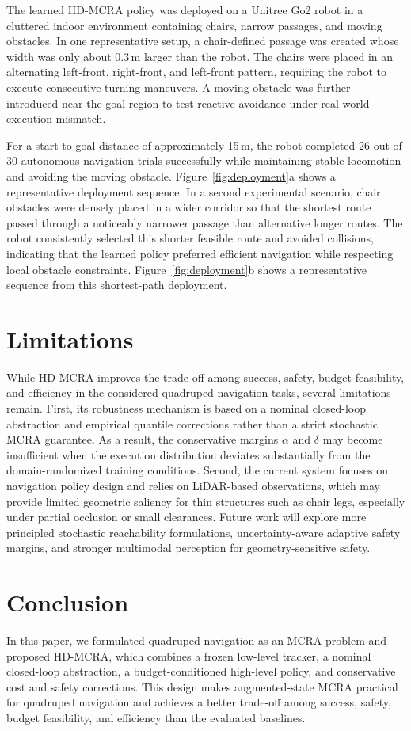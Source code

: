 \documentclass{article}
\begin{document}
The learned HD-MCRA policy was deployed on a Unitree Go2 robot in a cluttered indoor environment containing chairs, narrow passages, and moving obstacles. In one representative setup, a chair-defined passage was created whose width was only about 0.3\,m larger than the robot. The chairs were placed in an alternating left-front, right-front, and left-front pattern, requiring the robot to execute consecutive turning maneuvers. A moving obstacle was further introduced near the goal region to test reactive avoidance under real-world execution mismatch.

For a start-to-goal distance of approximately 15\,m, the robot completed 26 out of 30 autonomous navigation trials successfully while maintaining stable locomotion and avoiding the moving obstacle. Figure~\ref{fig:deployment}a shows a representative deployment sequence. In a second experimental scenario, chair obstacles were densely placed in a wider corridor so that the shortest route passed through a noticeably narrower passage than alternative longer routes. The robot consistently selected this shorter feasible route and avoided collisions, indicating that the learned policy preferred efficient navigation while respecting local obstacle constraints. Figure~\ref{fig:deployment}b shows a representative sequence from this shortest-path deployment.

\section{Limitations}

While HD-MCRA improves the trade-off among success, safety, budget feasibility, and efficiency in the considered quadruped navigation tasks, several limitations remain. First, its robustness mechanism is based on a nominal closed-loop abstraction and empirical quantile corrections rather than a strict stochastic MCRA guarantee. As a result, the conservative margins $\alpha$ and $\delta$ may become insufficient when the execution distribution deviates substantially from the domain-randomized training conditions. Second, the current system focuses on navigation policy design and relies on LiDAR-based observations, which may provide limited geometric saliency for thin structures such as chair legs, especially under partial occlusion or small clearances. Future work will explore more principled stochastic reachability formulations, uncertainty-aware adaptive safety margins, and stronger multimodal perception for geometry-sensitive safety.

\section{Conclusion}

In this paper, we formulated quadruped navigation as an MCRA problem and proposed HD-MCRA, which combines a frozen low-level tracker, a nominal closed-loop abstraction, a budget-conditioned high-level policy, and conservative cost and safety corrections. This design makes augmented-state MCRA practical for quadruped navigation and achieves a better trade-off among success, safety, budget feasibility, and efficiency than the evaluated baselines.


\end{document}
